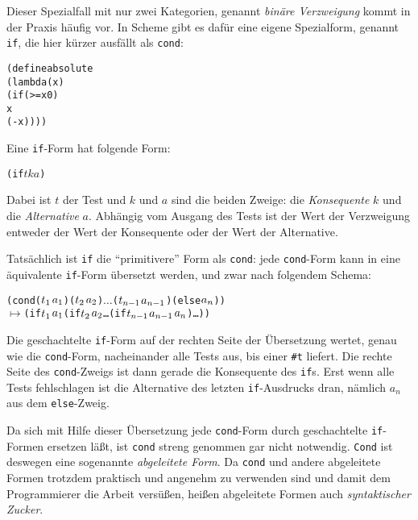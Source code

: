 %
Dieser Spezialfall mit nur zwei Kategorien, genannt \textit{binäre
  Verzweigung} kommt in der Praxis
häufig vor.  In Scheme gibt es dafür eine eigene Spezialform,
genannt \texttt{if}, die hier kürzer ausfällt
als \texttt{cond}:
%
\begin{alltt}
(define absolute
  (lambda (x)
    (if (>= x 0)
        x
        (- x))))
\end{alltt}
%
Eine \texttt{if}-Form hat folgende Form:
%
\begin{alltt}
(if \(t\) \(k\) \(a\))
\end{alltt}
Dabei ist $t$ der Test und $k$ und $a$ sind die
beiden Zweige: die \textit{Konsequente} $k$ und die
\textit{Alternative} $a$.  Abhängig vom Ausgang des
Tests ist der Wert der Verzweigung entweder der Wert der Konsequente
oder der Wert der Alternative.

Tatsächlich ist \texttt{if} die "`primitivere"' Form als
\texttt{cond}: jede \texttt{cond}-Form kann in eine äquivalente
\texttt{if}-Form übersetzt werden, und zwar nach
folgendem Schema:
%
\begin{alltt}
(cond (\(t\sb{1}\) \(a\sb{1}\)) (\(t\sb{2}\) \(a\sb{2}\)) \(\ldots\) (\(t\sb{n-1}\) \(a\sb{n-1}\)) (else \(a\sb{n}\)))
  \(\mapsto\) (if \(t\sb{1}\) \(a\sb{1}\) (if \(t\sb{2}\) \(a\sb{2}\) \ldots (if \(t\sb{n-1}\) \(a\sb{n-1}\) \(a\sb{n}\))\ldots))
\end{alltt}
%
Die geschachtelte \texttt{if}-Form auf der rechten Seite der
Übersetzung wertet, genau wie die \texttt{cond}-Form, nacheinander
alle Tests aus, bis einer \verb|#t| liefert.  Die rechte Seite des
\texttt{cond}-Zweigs ist dann gerade die Konsequente des \texttt{if}s.
Erst wenn alle Tests fehlschlagen ist die Alternative des letzten
\texttt{if}-Ausdrucks dran, nämlich $a_n$ aus dem \texttt{else}-Zweig.

Da sich mit Hilfe dieser Übersetzung jede \texttt{cond}-Form durch
geschachtelte \texttt{if}-Formen ersetzen läßt, ist \texttt{cond}
streng genommen gar nicht notwendig.  \texttt{Cond} ist deswegen eine
sogenannte \textit{abgeleitete Form}.  Da \texttt{cond} und andere
abgeleitete Formen trotzdem praktisch und angenehm zu verwenden sind
und damit dem Programmierer die Arbeit versüßen,
heißen abgeleitete Formen auch \textit{syntaktischer
  Zucker}.

